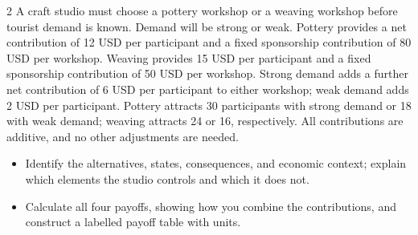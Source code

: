\begin{multicols}{2}\raggedcolumns
{}
A craft studio must choose a pottery workshop or a weaving workshop before tourist demand is known. Demand will be strong or weak. Pottery provides a net contribution of 12 USD per participant and a fixed sponsorship contribution of 80 USD per workshop. Weaving provides 15 USD per participant and a fixed sponsorship contribution of 50 USD per workshop. Strong demand adds a further net contribution of 6 USD per participant to either workshop; weak demand adds 2 USD per participant. Pottery attracts 30 participants with strong demand or 18 with weak demand; weaving attracts 24 or 16, respectively. All contributions are additive, and no other adjustments are needed.
\begin{itemize}
\item[\textbf{(C1)}] Identify the alternatives, states, consequences, and economic context; explain which elements the studio controls and which it does not. 
\item[\textbf{(C2)}] Calculate all four payoffs, showing how you combine the contributions, and construct a labelled payoff table with units. 
\end{itemize}


\end{multicols}
